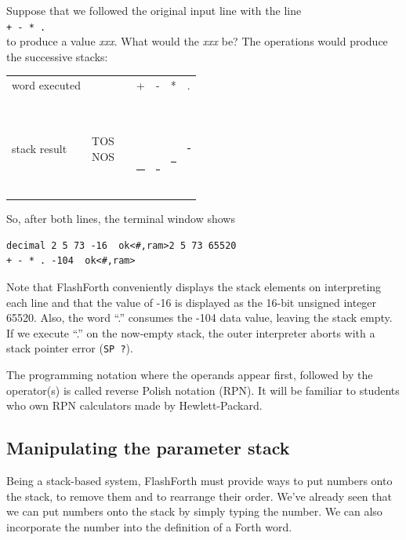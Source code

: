 \documentclass[12pt,a4paper]{article}
\begin{document}
\medskip
Suppose that we followed the original input line with the line \vspace{7pt} \\
\verb!+ - * .! \fbox{$\hookleftarrow$} \vspace{7pt} \\
to produce a value  \textit{xxx}.
What would the \textit{xxx} be?
The operations would produce the successive stacks:
\begin{center}
 \begin{tabular}{lc|ccccc}
 word executed & & & + & - & * & . \\
 \\
 stack result  
 & \parbox[t]{35pt}{TOS \\ NOS} 
 & \parbox[t]{30pt}{ \\  \\  \\  \\ \rule{30pt}{2pt}} 
 & \parbox[t]{30pt}{ \  \\  \\ \rule{30pt}{2pt}}
 & \parbox[t]{30pt}{ \\  \\ \rule{30pt}{2pt}}
 & \parbox[t]{30pt}{ \\ \rule{30pt}{2pt}}
 & \parbox[t]{30pt}{\rule{30pt}{2pt}} \\
 \end{tabular}
\end{center}
So, after both lines, the terminal window shows
\begin{verbatim}
decimal 2 5 73 -16  ok<#,ram>2 5 73 65520 
+ - * . -104  ok<#,ram>
\end{verbatim}
Note that FlashForth conveniently displays the stack elements on interpreting each line 
and that the value of -16 is displayed as the 16-bit unsigned integer 65520.
Also, the word ``.'' consumes the -104 data value, leaving the stack empty.
If we execute ``.'' on the now-empty stack, the outer interpreter aborts with
a stack pointer error (\verb!SP ?!).

\medskip
The programming notation where the operands appear first,
followed by the operator(s) is called reverse Polish notation (RPN).
It will be familiar to students who own RPN calculators made by Hewlett-Packard.


\medskip
\subsection{Manipulating the parameter stack}
\label{sec:parameter-stack}
%
Being a stack-based system, FlashForth must provide ways to put numbers onto the stack,
to remove them and to rearrange their order.
We've already seen that we can put numbers onto the stack by simply typing the number.
We can also incorporate the number into the definition of a Forth word.
\end{document}
